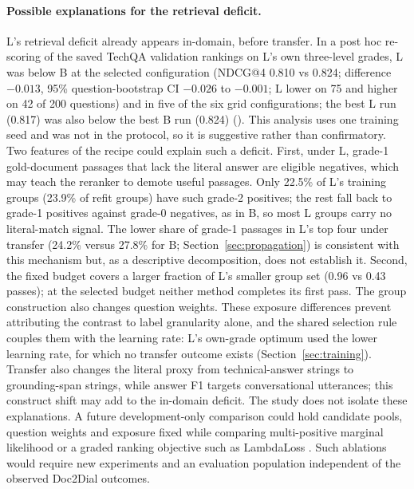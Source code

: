 \paragraph{Possible explanations for the retrieval deficit.} L's retrieval deficit already appears in-domain, before transfer. In a post hoc re-scoring of the saved TechQA validation rankings on L's own three-level grades, L was below B at the selected configuration (NDCG@4 0.810 vs 0.824; difference $-0.013$, 95\% question-bootstrap CI $-0.026$ to $-0.001$; L lower on 75 and higher on 42 of 200 questions) and in five of the six grid configurations; the best L run (0.817) was also below the best B run (0.824) (). This analysis uses one training seed and was not in the protocol, so it is suggestive rather than confirmatory. Two features of the recipe could explain such a deficit. First, under L, grade-1 gold-document passages that lack the literal answer are eligible negatives, which may teach the reranker to demote useful passages. Only 22.5\% of L's training groups (23.9\% of refit groups) have such grade-2 positives; the rest fall back to grade-1 positives against grade-0 negatives, as in B, so most L groups carry no literal-match signal. The lower share of grade-1 passages in L's top four under transfer (24.2\% versus 27.8\% for B; Section~\ref{sec:propagation}) is consistent with this mechanism but, as a descriptive decomposition, does not establish it. Second, the fixed budget covers a larger fraction of L's smaller group set (0.96 vs 0.43 passes); at the selected budget neither method completes its first pass. The group construction also changes question weights. These exposure differences prevent attributing the contrast to label granularity alone, and the shared selection rule couples them with the learning rate: L's own-grade optimum used the lower learning rate, for which no transfer outcome exists (Section~\ref{sec:training}). Transfer also changes the literal proxy from technical-answer strings to grounding-span strings, while answer F1 targets conversational utterances; this construct shift may add to the in-domain deficit. The study does not isolate these explanations. A future development-only comparison could hold candidate pools, question weights and exposure fixed while comparing multi-positive marginal likelihood \citep{zhang2025utility} or a graded ranking objective such as LambdaLoss \citep{wang2018lambda}. Such ablations would require new experiments and an evaluation population independent of the observed Doc2Dial outcomes.

